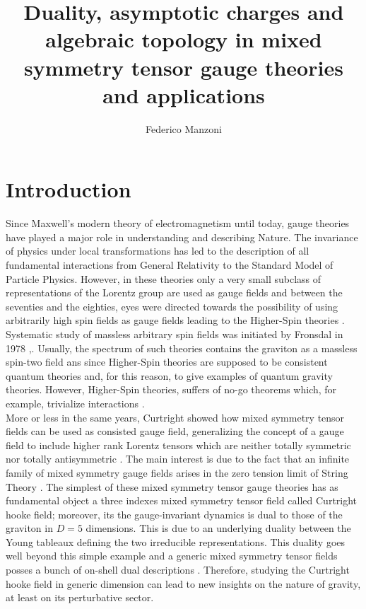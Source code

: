 \documentclass[a4paper,12pt]{article}
\title{\textbf Duality, asymptotic charges and algebraic topology in mixed symmetry tensor gauge theories and applications}
\author[a,b]{Federico Manzoni}
\affiliation[a]{Mathematics and Physics department, Roma Tre, Via della Vasca Navale 84, Rome, Italy}
\affiliation[b]{INFN Roma Tre Section, Physics department, Via della Vasca Navale 84, Rome, Italy}
\begin{document}
 


\maketitle

\section{Introduction}
Since Maxwell's modern theory of electromagnetism \cite{max} until today, gauge theories have played a major role in understanding and describing Nature. The invariance of physics under local transformations has led to the description of all fundamental interactions from General Relativity to the Standard Model of Particle Physics. However, in these theories only a very small subclass of representations of the Lorentz group are used as gauge fields and between the seventies and the eighties, eyes were directed towards the possibility of using arbitrarily high spin fields as gauge fields leading to the Higher-Spin theories \cite{Curtright:1980un,Francia:2004lbf, Campoleoni:2017qot,Campoleoni:2018uib,Campoleoni:2020ejn,sagnotti2012notes,Didenko:2014dwa,Campoleoni:2017mbt}. Systematic study of massless arbitrary spin fields was initiated by Fronsdal in 1978 \cite{fron1},\cite{fron2}. Usually, the spectrum of such theories contains the graviton as a massless spin-two field ans since Higher-Spin theories are supposed to be consistent quantum theories and, for this reason, to give examples of quantum gravity theories. However, Higher-Spin theories, suffers of no-go theorems which, for example, trivialize interactions \cite{mandu,Argyres:1989cu,Aragone:1979bm,Aragone:1983sz,Weinberg:1964ew,sagnotti2012notes}. \\ More or less in the same years, Curtright showed how mixed symmetry tensor fields can be used as consisted gauge field, generalizing the concept of a gauge field to include higher rank Lorentz tensors which are neither totally symmetric nor totally antisymmetric \cite{Curtright:1980yk}. The main interest is due to the fact that an infinite family of mixed symmetry gauge fields arises in the zero tension limit of String Theory \cite{Bonelli_2003}. The simplest of these mixed symmetry tensor gauge theories has as fundamental object a three indexes mixed symmetry tensor field called Curtright hooke field; moreover, its the gauge-invariant dynamics is dual to those of the graviton in $D=5$ dimensions. This is due to an underlying duality between the Young tableaux defining the two irreducible representations. This duality goes well beyond this simple example and a generic mixed symmetry tensor fields posses a bunch of on-shell dual descriptions \cite{hamermesh1989group}. Therefore, studying the Curtright hooke field in generic dimension can lead to new insights on the nature of gravity, at least on its perturbative sector.
\end{document}
